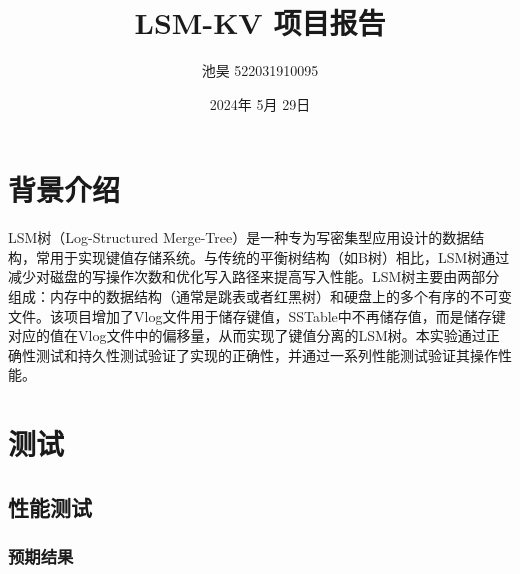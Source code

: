 \documentclass[fontset=windows]{article}
\title{LSM-KV 项目报告}
\author{池昊 522031910095}
\date{2024年 5月 29日}
\begin{document}
\maketitle

\section{背景介绍}
LSM树（Log-Structured Merge-Tree）是一种专为写密集型应用设计的数据结构，常用于实现键值存储系统。与传统的平衡树结构（如B树）相比，LSM树通过减少对磁盘的写操作次数和优化写入路径来提高写入性能。LSM树主要由两部分组成：内存中的数据结构（通常是跳表或者红黑树）和硬盘上的多个有序的不可变文件。该项目增加了Vlog文件用于储存键值，SSTable中不再储存值，而是储存键对应的值在Vlog文件中的偏移量，从而实现了键值分离的LSM树。本实验通过正确性测试和持久性测试验证了实现的正确性，并通过一系列性能测试验证其操作性能。

\section{测试}

\subsection{性能测试}

\subsubsection{预期结果}
\end{document}
